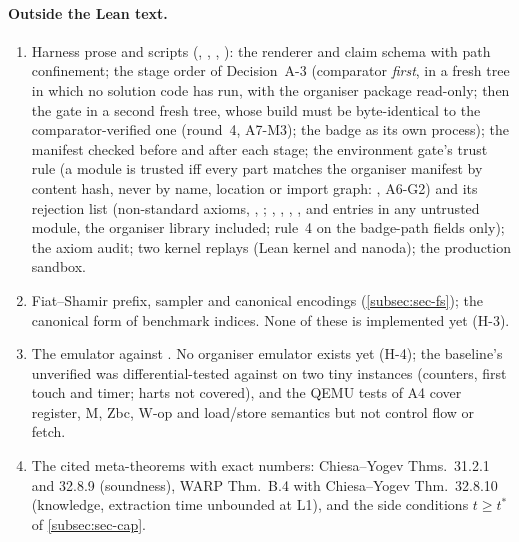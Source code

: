 \paragraph{Outside the Lean text.}
\begin{enumerate}[nosep,leftmargin=1.6em,resume]
\item Harness prose and scripts (, , ,
  ): the renderer and claim schema with path confinement; the stage order of
  Decision~A-3 (comparator \emph{first}, in a fresh tree in which no solution code has run, with the
  organiser package read-only; then the gate in a second fresh tree, whose build must be
  byte-identical to the comparator-verified one (round~4, A7-M3); the badge as its own process);
  the  manifest checked before and after each stage; the environment gate's trust rule (a
  module is trusted iff every  part matches the organiser manifest by content hash, never
  by name, location or import graph: , A6-G2) and its rejection list (non-standard
  axioms, , ; , ,
  , ,  and  entries in any untrusted module,
  the organiser library included; rule~4 on the badge-path fields only); the axiom audit; two kernel
  replays (Lean kernel and nanoda);
  the production sandbox.
\item Fiat--Shamir prefix, sampler and canonical encodings (\cref{subsec:sec-fs}); the canonical
  form of benchmark indices. None of these is implemented yet (H-3).
\item The emulator against . No organiser emulator exists yet (H-4); the baseline's
  unverified  was differential-tested against  on two tiny instances
  (counters, first touch and timer; harts not covered), and the QEMU tests of A4 cover register, M,
  Zbc, W-op and load/store semantics but not control flow or fetch.
\item The cited meta-theorems with exact numbers: Chiesa--Yogev Thms.~31.2.1 and 32.8.9 (soundness),
  WARP Thm.~B.4 with Chiesa--Yogev Thm.~32.8.10 (knowledge, extraction time unbounded at L1), and the
  side conditions $t\ge t^*$ of \cref{subsec:sec-cap}.
\end{enumerate}

